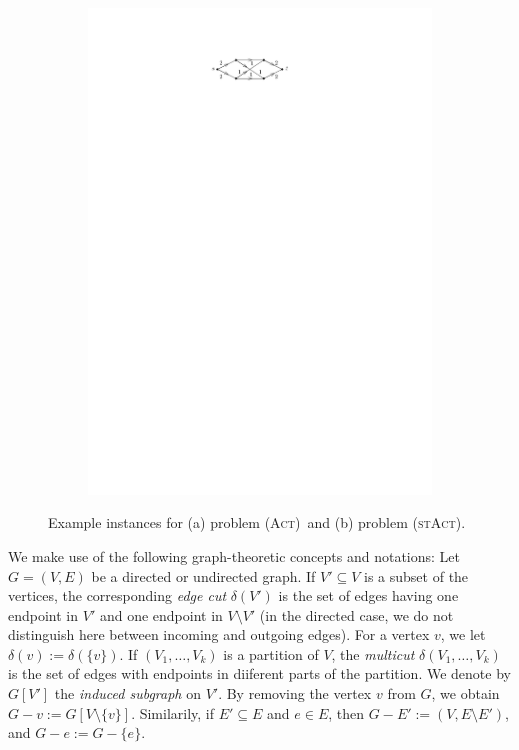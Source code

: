 \documentclass[runningheads]{llncs}
\numberwithin{equation}{section}
\newcommand{\set}[1]{\{ #1 \}}
\newcommand{\act}{\textsc{(Act)}}
\newcommand{\stact}{\textsc{(stAct)}}
\begin{document}
\begin{figure}
\begin{subfigure}[t]{0.3\textwidth}
         \label{fig:example_act}
     \end{subfigure}
     \begin{subfigure}[t]{0.3\textwidth}
         \centering
         \includegraphics[scale=1]{img/example-st-act}
         \label{fig:example_st_act}
     \end{subfigure}
        \caption{Example instances for (a) problem \act\ and (b) problem \stact.}
        \label{fig:introduction_examples}
\end{figure}

We make use of the following graph-theoretic concepts and notations: Let $G = (V,E)$ be a directed or undirected graph. If $V' \subseteq V$ is a subset of the vertices, the corresponding \emph{edge cut} $\delta(V')$ is the set of edges having one endpoint in $V'$ and one endpoint in $V \setminus V'$ (in the directed case, we do not distinguish here between incoming and outgoing edges). For a vertex $v$, we let $\delta(v) := \delta(\set{v})$. If $(V_1,\dots,V_k)$ is a partition of $V$, the \emph{multicut} $\delta(V_1,\dots,V_k)$ is the set of edges with endpoints in diiferent parts of the partition. We denote by $G[V']$ the \emph{induced subgraph} on $V'$. By removing the vertex $v$ from $G$, we obtain $G - v := G[V \setminus \set{v}]$. Similarily, if $E' \subseteq E$ and $e \in E$, then $G - E' := (V, E \setminus E')$, and $G - e := G - \set{e}$.
\end{document}
